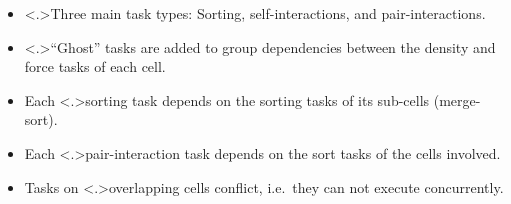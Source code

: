 \documentclass{beamer}
\begin{document}
    \begin{frame}
    
        \pause

        \begin{columns}
        
            \begin{itemize}

                \item<+-> \alert<.>{Three main task types}: \alert<+>{Sorting},
                    \alert<+>{self-interactions},
                    and \alert<+>{pair-interactions}.
                    
                \item<+-> \alert<.>{``Ghost'' tasks} are added to group dependencies
                    between the density and force tasks of each cell.
                    
                \item<+-> Each \alert<.>{sorting task} depends on the sorting tasks
                    of its sub-cells (merge-sort).
                    
                \item<+-> Each \alert<.>{pair-interaction} task depends on the sort tasks
                    of the cells involved.
                    
                \item<+-> Tasks on \alert<.>{overlapping cells conflict}, i.e.~they can
                    not execute concurrently.

            \end{itemize}
            
         
        \end{columns}
    \end{frame}
    
\end{document}
